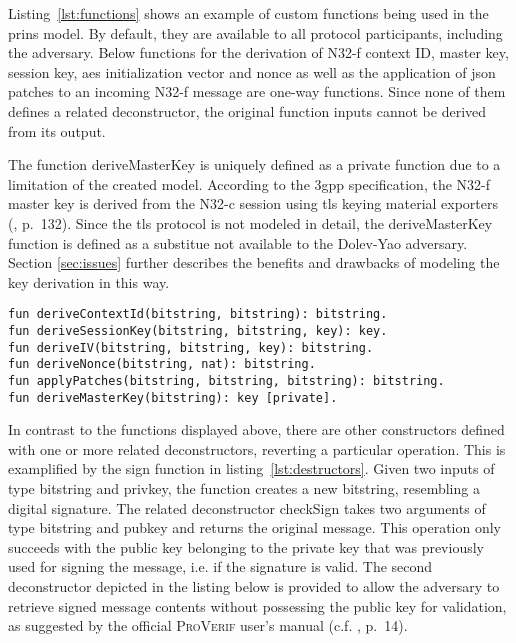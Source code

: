 Listing~\ref{lst:functions} shows an example of custom functions being used in the \gls{prins} model.
By default, they are available to all protocol participants, including the adversary.
Below functions for the derivation of N32-f context ID, master key, session key, \gls{aes} initialization vector and nonce as well as the application of json patches to an incoming N32-f message are one-way functions.
Since none of them defines a related deconstructor, the original function inputs cannot be derived from its output.

The function {\sffamily deriveMasterKey} is uniquely defined as a private function due to a limitation of the created model.
According to the \gls{3gpp} specification, the N32-f master key is derived from the N32-c session using \gls{tls} keying material exporters (\cite{3gpp.33.501}, p.~132).
Since the \gls{tls} protocol is not modeled in detail, the {\sffamily deriveMasterKey} function is defined as a substitue not available to the Dolev-Yao adversary.
Section \ref{sec:issues} further describes the benefits and drawbacks of modeling the key derivation in this way.

\begin{lstlisting}[caption={Definition of custom one-way functions},label={lst:functions},firstnumber=124]
fun deriveContextId(bitstring, bitstring): bitstring.
fun deriveSessionKey(bitstring, bitstring, key): key.
fun deriveIV(bitstring, bitstring, key): bitstring.
fun deriveNonce(bitstring, nat): bitstring.
fun applyPatches(bitstring, bitstring, bitstring): bitstring.
fun deriveMasterKey(bitstring): key [private].
\end{lstlisting}

In contrast to the functions displayed above, there are other constructors defined with one or more related deconstructors, reverting a particular operation.
This is examplified by the {\sffamily sign} function in listing~\ref{lst:destructors}.
Given two inputs of type {\sffamily bitstring} and {\sffamily privkey}, the function creates a new {\sffamily bitstring}, resembling a digital signature.
The related deconstructor {\sffamily checkSign} takes two arguments of type {\sffamily bitstring} and {\sffamily pubkey} and returns the original message.
This operation only succeeds with the public key belonging to the private key that was previously used for signing the message, i.e. if the signature is valid.
The second deconstructor depicted in the listing below is provided to allow the adversary to retrieve signed message contents without possessing the public key for validation, as suggested by the official \textsc{ProVerif} user's manual (c.f. \cite{blanchet2020proverif}, p.~14).

